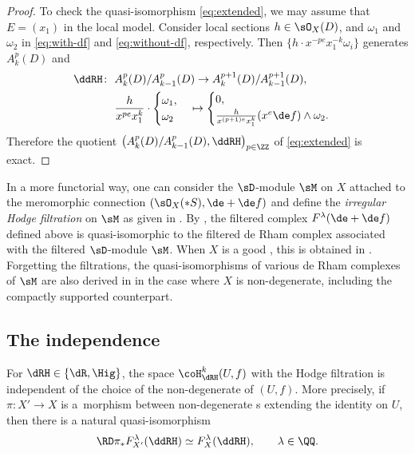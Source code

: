 \begin{proof}
To check the quasi-isomorphism \eqref{eq:extended}, we may assume that $E = (x_1)$ in the local model. Consider local sections $h\in\sO_X(D)$, and $\omega_1$ and $\omega_2$ in \eqref{eq:with-df} and \eqref{eq:without-df},
respectively. Then $\big\{h\cdot x^{-pe}x_1^{-k}\omega_i\big\}$ generates $A_k^p(D)$ and
\begin{align*}
\ddRH\colon \ & A_k^p(D)/A_{k-1}^p(D) \to A_k^{p+1}(D)/A_{k-1}^{p+1}(D), \\
& \frac{h}{x^{pe}x_1^k}\cdot \begin{cases}
\omega_1, \\ \omega_2
\end{cases}
 \mapsto \begin{cases}
0, \\
\frac{h}{x^{(p+1)e} x_1^k} (x^e\de f)\wedge\omega_2.
\end{cases}
\end{align*}
Therefore the quotient $\big(A_k^p(D)/A_{k-1}^p(D),\ddRH\big)_{p\in\ZZ}$ of \eqref{eq:extended} is exact.
\end{proof}

\begin{remark*} In a more functorial way, one can consider the $\sD$-module $\sM$ on $X$ attached to the meromorphic connection $(\sO_X(*S),\de +\de f)$ and define the \textit{irregular Hodge filtration} on $\sM$ as given in \cite[Definition~5.1]{SY}. By \cite[Lemma~9.17]{SY}, the filtered complex $F^\lambda(\de +\de f)$ defined above is quasi-isomorphic to the filtered de Rham complex associated with the filtered $\sD$-module $\sM$. When $X$ is a good {\cpt}, this is obtained in \cite[Proposition~1.7.4]{ESY}. Forgetting the filtrations, the quasi-isomorphisms of various de Rham complexes of $\sM$ are also derived in \cite[Lemmas 2.13 and 2.15]{M_GKZ} in the case where $X$ is non-degenerate, including the compactly supported counterpart.
\end{remark*}

\subsection{The independence}
\begin{proposition*}
For $\dRH \in \{\dR,\Hig\}$, the space $\coH_\dRH^k(U,f)$ with the Hodge filtration is independent of the choice of the non-degenerate {\cpt} of $(U,f)$. More precisely, if $\pi\colon X' \to X$ is a~morphism between non-degenerate {\cpt}s extending the identity on $U$, then there is a natural quasi-isomorphism
\begin{gather}\label{eq:RpiF}
\RD\pi_* F^\lambda_{X'}(\ddRH) \simeq F^\lambda_X(\ddRH), \qquad \lambda\in\QQ.
\end{gather}
\end{proposition*}

